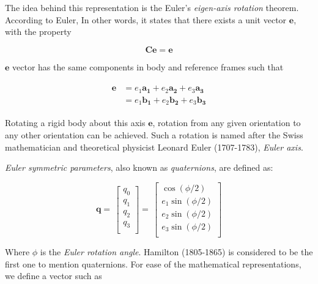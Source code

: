 The idea behind this representation is the Euler's \emph{eigen-axis rotation} theorem. 
According to Euler,  In other words, it states that there exists a unit vector $\bm{e}$, with the property

\begin{equation}
\label{eqn:quat1}
\bm{C}\bm{e}= \bm{e}
\end{equation}

$\bm{e}$ vector has the same components in body and reference frames such that

\begin{align}
\label{eqn:quat2}
\begin{split}
\bm{e} & = e_1 \bm{a_1} + e_2 \bm{a_2} + e_3 \bm{a_3}
\\
& = e_1 \bm{b_1} + e_2 \bm{b_2} + e_3 \bm{b_3}
\end{split}
\end{align}
 
Rotating a rigid body about this axis $\bm{e}$, rotation from any given orientation to any other orientation can be achieved. 
Such a rotation is named after the Swiss mathematician and theoretical physicist Leonard Euler (1707-1783), \emph{Euler axis}.

\emph{Euler symmetric parameters}, also known as \emph{quaternions}, are defined as:
 
 \begin{equation}
 \label{eqn:quat3}
\bm{q}
=\,
\begin{bmatrix}
q_0\\[0.3em]
q_1\\[0.3em]
q_2\\[0.3em]
q_3\\[0.3em]
\end{bmatrix}
=\,
\begin{bmatrix}
\cos(\phi/2)\\[0.3em]
e_1 \sin(\phi/2)\\[0.3em]
e_2 \sin(\phi/2)\\[0.3em]
e_3 \sin(\phi/2)\\[0.3em]
\end{bmatrix}
\end{equation}
 
Where $\phi$ is the \emph{Euler rotation angle}. 
Hamilton (1805-1865) is considered to be the first one to mention quaternions. 
For ease of the mathematical representations, we define a vector such as


